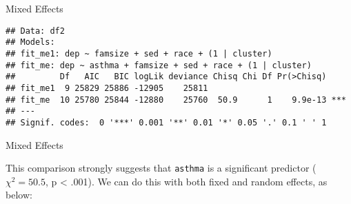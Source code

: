 \begin{frame}[fragile]{Mixed Effects}

\footnotesize

\begin{Shaded}
\begin{Highlighting}[]
\StringTok{ }\OperatorTok{~}\StringTok{ }\OperatorTok{+}\StringTok{ }\OperatorTok{+}\StringTok{ }\OperatorTok{+}\StringTok{ }\NormalTok{(} \OperatorTok{|}\StringTok{ }
                \NormalTok{)}

\end{Highlighting}
\end{Shaded}

\begin{verbatim}
## Data: df2
## Models:
## fit_me1: dep ~ famsize + sed + race + (1 | cluster)
## fit_me: dep ~ asthma + famsize + sed + race + (1 | cluster)
##         Df   AIC   BIC logLik deviance Chisq Chi Df Pr(>Chisq)    
## fit_me1  9 25829 25886 -12905    25811                            
## fit_me  10 25780 25844 -12880    25760  50.9      1    9.9e-13 ***
## ---
## Signif. codes:  0 '***' 0.001 '**' 0.01 '*' 0.05 '.' 0.1 ' ' 1
\end{verbatim}

\end{frame}

\begin{frame}[fragile]{Mixed Effects}

This comparison strongly suggests that \texttt{asthma} is a significant
predictor (\(\chi^2 = 50.5\), p \textless{} .001). We can do this with
both fixed and random effects, as below:

\footnotesize

\begin{Shaded}
\begin{Highlighting}[]
\StringTok{ }\OperatorTok{~}\StringTok{ }\OperatorTok{+}\StringTok{ }\OperatorTok{+}\StringTok{ }\OperatorTok{+}\StringTok{ }\NormalTok{(} \OperatorTok{|}\StringTok{ }
                \NormalTok{)}
\StringTok{ }\OperatorTok{~}\StringTok{ }\OperatorTok{+}\StringTok{ }\OperatorTok{+}\StringTok{ }\OperatorTok{+}\StringTok{ }\NormalTok{(} \OperatorTok{+}\StringTok{ }\OperatorTok{|}\StringTok{ }
                \NormalTok{)}
\end{Highlighting}
\end{Shaded}

\end{frame}

